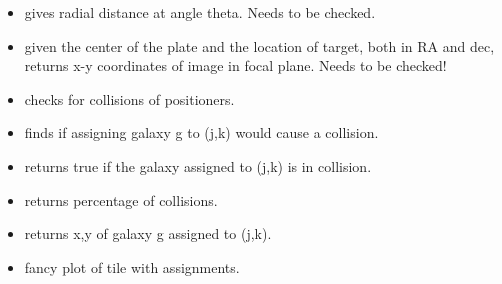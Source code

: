 \documentclass[12pt]{article}
\begin{document}
\begin{itemize}
\begin{itemize}
	\end{itemize}
\item {} gives radial distance at angle theta.  Needs to be checked.
\item {} given the center of the plate and the location of target, both in RA and dec, returns x-y coordinates of image in focal plane.  Needs to be checked!
\item {} checks for collisions of positioners.
\item {} finds if assigning galaxy g to (j,k) would cause a collision.
\item {} returns true if the galaxy assigned to (j,k) is in collision.
\item {} returns percentage of collisions.
\item {} returns x,y of galaxy g assigned to (j,k).
\item {} fancy plot of tile with assignments.



\end{itemize}
\end{document}
